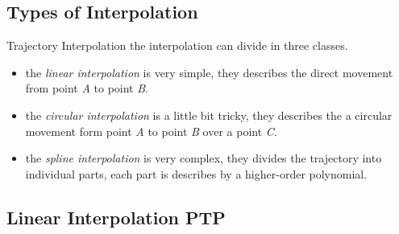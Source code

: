 \documentclass[%
  professionalfonts,%
  xcolor={%
    usenames,%
    dvipsnames,%
    svgnames,%
    table,%
    hyperref%
  }%
]{beamer}
\begin{document}
\subsection{Types of Interpolation}
\begin{frame}{Trajectory Interpolation}
the interpolation can divide in three classes.
\begin{itemize}
\item the \emph{linear interpolation} is very simple, they describes the direct movement from point \emph{A} to point \emph{B}.
\item the \emph{circular interpolation} is a little bit tricky, they describes the a circular movement form point \emph{A} to point \emph{B} over a point \emph{C}.
\item the \emph{spline interpolation} is very complex, they divides the trajectory into individual parts, each part is describes by a higher-order polynomial.
\end{itemize}
\end{frame}

\subsection{Linear Interpolation PTP}
%

\end{document}
